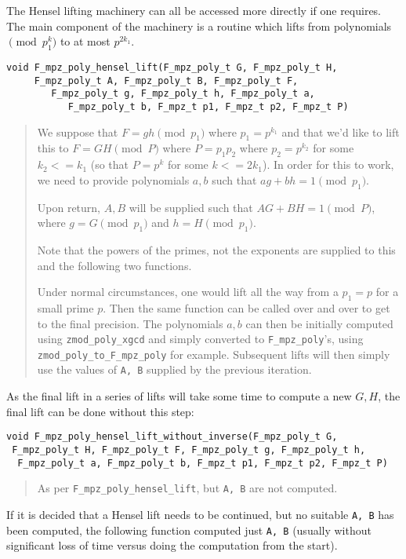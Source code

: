 \documentclass[a4paper,10pt]{article}
\newcommand{\code}{\lstinline}
\begin{document}
The Hensel lifting machinery can all be accessed more directly if one requires. The main component of
the machinery is a routine which lifts from polynomials $\pmod{p^k_1}$ to at most $p^{2k_1}$. 

\begin{lstlisting}
void F_mpz_poly_hensel_lift(F_mpz_poly_t G, F_mpz_poly_t H, 
     F_mpz_poly_t A, F_mpz_poly_t B, F_mpz_poly_t F, 
        F_mpz_poly_t g, F_mpz_poly_t h, F_mpz_poly_t a, 
           F_mpz_poly_t b, F_mpz_t p1, F_mpz_t p2, F_mpz_t P)
\end{lstlisting}
\begin{quote}
We suppose that $F = gh \pmod{p_1}$ where $p_1 = p^{k_1}$ and that we'd like to lift this to 
$F = GH \pmod{P}$ where $P = p_1p_2$ where $p_2 = p^{k_2}$ for some $k_2 <= k_1$ (so that $P = p^k$
for some $k <= 2k_1$). In order for this to work, we need to provide polynomials $a, b$ such that
$ag + bh = 1 \pmod{p_1}$. 

Upon return, $A, B$ will be supplied such that $AG + BH = 1 \pmod{P}$, where $g = G \pmod{p_1}$ 
and $h = H \pmod{p_1}$. 

Note that the powers of the primes, not the exponents are supplied to this and the following two 
functions.

Under normal circumstances, one would lift all the way from a $p_1 = p$ for a small prime $p$. Then
the same function can be called over and over to get to the final precision. The polynomials $a, b$
can then be initially computed using \code{zmod_poly_xgcd} and simply converted to \code{F_mpz_poly}'s,
using \code{zmod_poly_to_F_mpz_poly} for example. Subsequent lifts will then simply use the values
of \code{A, B} supplied by the previous iteration. 
\end{quote}

As the final lift in a series of lifts will take some time to compute a new $G, H$, the final lift 
can be done without this step:

\begin{lstlisting}
void F_mpz_poly_hensel_lift_without_inverse(F_mpz_poly_t G, 
 F_mpz_poly_t H, F_mpz_poly_t F, F_mpz_poly_t g, F_mpz_poly_t h, 
  F_mpz_poly_t a, F_mpz_poly_t b, F_mpz_t p1, F_mpz_t p2, F_mpz_t P)
\end{lstlisting}
\begin{quote}
As per \code{F_mpz_poly_hensel_lift}, but \code{A, B} are not computed.
\end{quote}

If it is decided that a Hensel lift needs to be continued, but no suitable \code{A, B} has been 
computed, the following function computed just \code{A, B} (usually without significant loss of
time versus doing the computation from the start).
\end{document}
